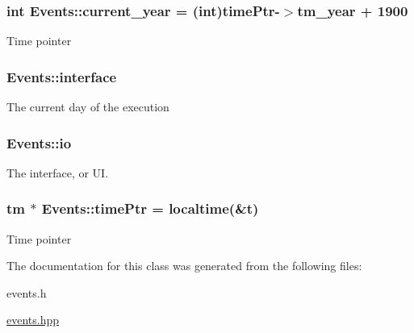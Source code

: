 \subsubsection[{\texorpdfstring{current\+\_\+year}{current_year}}]{\setlength{\rightskip}{0pt plus 5cm}int Events\+::current\+\_\+year = (int){\bf time\+Ptr}-\/$>$tm\+\_\+year + 1900\hspace{0.3cm}{\ttfamily [static]}}\hypertarget{classEvents_a772f653c845f4eedf58ba446b7fee45a}{}\label{classEvents_a772f653c845f4eedf58ba446b7fee45a}
Time pointer 
\subsubsection[{\texorpdfstring{interface}{interface}}]{ Events\+::interface\hspace{0.3cm}{\ttfamily [static]}}\hypertarget{classEvents_a397cb3524ec70d64e22144c12d53edda}{}\label{classEvents_a397cb3524ec70d64e22144c12d53edda}
The current day of the execution 
\subsubsection[{\texorpdfstring{io}{io}}]{ Events\+::io\hspace{0.3cm}{\ttfamily [static]}}\hypertarget{classEvents_a7b8a2caf783b96de00de01145a8763d2}{}\label{classEvents_a7b8a2caf783b96de00de01145a8763d2}
The interface, or UI. 
\subsubsection[{\texorpdfstring{time\+Ptr}{timePtr}}]{\setlength{\rightskip}{0pt plus 5cm}tm $\ast$ Events\+::time\+Ptr = localtime(\&t)\hspace{0.3cm}{\ttfamily [static]}}\hypertarget{classEvents_ad5ad3f8eb6f5d0875ab7a74fb2bb06e5}{}\label{classEvents_ad5ad3f8eb6f5d0875ab7a74fb2bb06e5}
Time pointer 

The documentation for this class was generated from the following files\+:\begin{DoxyCompactItemize}
\item 
events.\+h\item 
\hyperlink{events_8hpp}{events.\+hpp}\end{DoxyCompactItemize}
